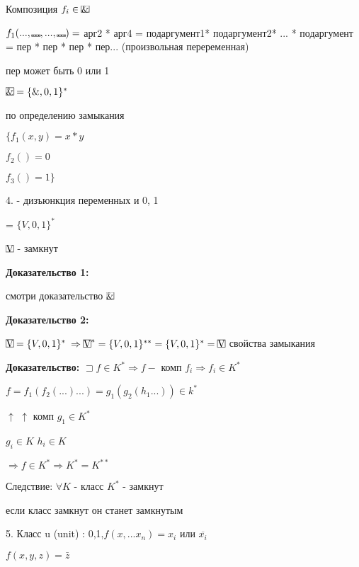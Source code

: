 \documentclass[russian]{lecture-notes}
\begin{document}
\begin{example}
		Композиция $f_{i} \in \frame{\&}$

		$f_1(...,\frame{...},...,\frame{...}) = $ арг2 * арг4 = подаргумент1* подаргумент2* ... * подаргумент =
		пер * пер * пер * пер... (произвольная переременная)

		пер может быть 0 или 1

		\begin{proposition}
			$\frame{\&} = \{\&,0,1\}^{*}$

			по определению замыкания

			$\{f_{1}(x,y) = x*y$

			$f_{2}() = 0$

			$f_{3}() = 1\}$

			\end{proposition}

		4.  - дизъюнкция переменных и 0, 1

		 = $\{V,0,1\}^{*}$

		\begin{proposition}

			$\frame{V} $ - замкнут

			\end{proposition}

		\textbf{Доказательство 1: }

		смотри доказательство $\frame{\&}$


		\textbf{Доказательство 2: }

		$\frame{V} = \{V,0,1\}^{*}$ 
		$\Rightarrow \frame{V}^{*} = \{V,0,1\}^{**} = \{V,0,1\}^{*} = \frame{V}$ свойства замыкания

		\end{example}

	\textbf{Доказательство: } $\sqsupset  f \in K^{*} \Rightarrow f - $ комп $f_{i}
	\Rightarrow f_{i} \in K^{*}
	$

	$ f = f_{1} (f_2(...)...) = g_{1}(g_{2}(h_{1}...)) \in k^{*}
	$

	\qquad $\uparrow$ \quad $\uparrow$ \qquad комп $g_{1} \in K^{*}$

	$g_{i} \in K $ $h_{i} \in K$

	$\Rightarrow f \in K^{*} \Rightarrow K^{*} = K^{**}$

	Следствие: $\forall K$ - класс $K^{*}$ - замкнут

	если класс замкнут он станет замкнутым

	5. Класс u (unit) : 0,1,$f(x,...x_{n}) = x_{i}$ или  $\overline{x_{i}}$

	$f(x,y,z) = \bar{z}$
\end{document}

